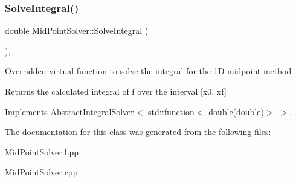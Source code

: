 \subsubsection{\texorpdfstring{Solve\+Integral()}{SolveIntegral()}}
{\footnotesize\ttfamily double Mid\+Point\+Solver\+::\+Solve\+Integral (\begin{DoxyParamCaption}{ }\end{DoxyParamCaption})\hspace{0.3cm}{\ttfamily [override]}, {\ttfamily [virtual]}}

Overridden virtual function to solve the integral for the 1D midpoint method \begin{DoxyReturn}{Returns}
the calculated integral of f over the interval \mbox{[}x0, xf\mbox{]} 
\end{DoxyReturn}


Implements \hyperlink{class_abstract_integral_solver_ad87cb44c5ef3122bc95be48f473ba399}{Abstract\+Integral\+Solver$<$ std\+::function$<$ double(double)$>$ $>$}.



The documentation for this class was generated from the following files\+:\begin{DoxyCompactItemize}
\item 
Mid\+Point\+Solver.\+hpp\item 
Mid\+Point\+Solver.\+cpp\end{DoxyCompactItemize}
